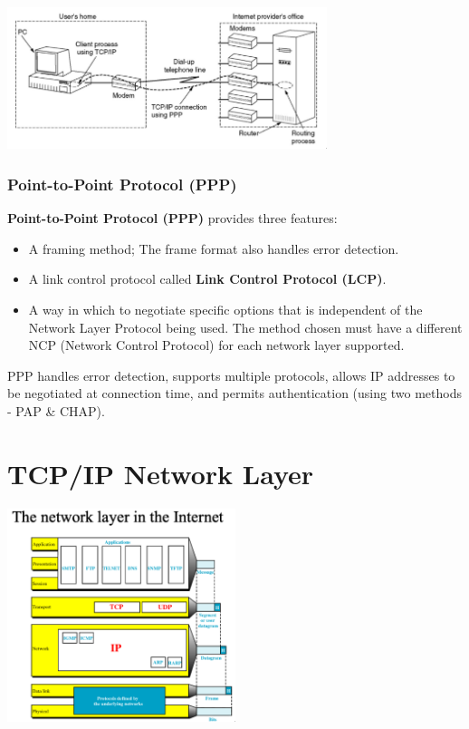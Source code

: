 \documentclass[11pt]{article}
\begin{document}
\begin{center}
    \includegraphics[width=0.7\textwidth]{thedatalinklayerintheinternet.png}
\end{center}

\newpage
\subsubsection{Point-to-Point Protocol (PPP)}
\textbf{Point-to-Point Protocol (PPP)} provides three features:
\begin{itemize}
    \item   A framing method; The frame format also handles error detection.
    \item   A link control protocol called \textbf{Link Control Protocol (LCP)}. 
    \item   A way in which to negotiate specific options that is independent of the Network Layer Protocol being used.
            The method chosen must have a different NCP (Network Control Protocol) for each network layer supported.
\end{itemize}

PPP handles error detection, supports multiple protocols, allows IP addresses to be negotiated at connection time, 
and permits authentication (using two methods - PAP \& CHAP).

\section{TCP/IP Network Layer}
\begin{center}
    \includegraphics[width=0.5\textwidth]{thenetworklayerintheinternet.png}
\end{center}
\end{document}

